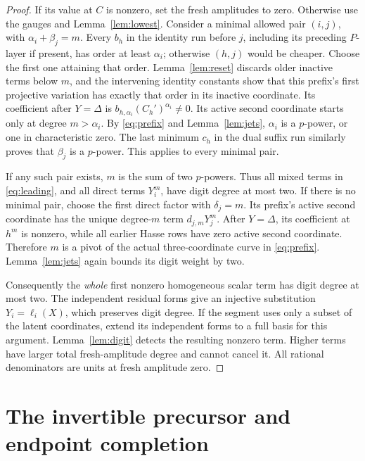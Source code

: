 \documentclass[11pt]{article}
\begin{document}
\begin{proof}
If its value at \(C\) is nonzero, set the fresh amplitudes to zero.
Otherwise use the gauges and Lemma~\ref{lem:lowest}. Consider a minimal
allowed pair \((i,j)\), with \(\alpha_i+\beta_j=m\). Every \(b_h\)
in the identity run before \(j\), including its preceding \(P\)-layer
if present, has order at least \(\alpha_i\); otherwise \((h,j)\)
would be cheaper. Choose the first one attaining that order.
Lemma~\ref{lem:reset} discards older inactive terms below \(m\), and
the intervening identity constants show that this prefix's first
projective variation has exactly that order in its inactive coordinate.
Its coefficient after \(Y=\Delta\) is
\(b_{h,\alpha_i}(C_h')^{\alpha_i}\ne0\). Its active second coordinate
starts only at degree \(m>\alpha_i\). By \eqref{eq:prefix} and
Lemma~\ref{lem:jets}, \(\alpha_i\) is a \(p\)-power, or one in
characteristic zero. The last minimum \(c_h\) in the dual suffix run
similarly proves that \(\beta_j\) is a \(p\)-power. This applies to
every minimal pair.

If any such pair exists, \(m\) is the sum of two \(p\)-powers. Thus
all mixed terms in \eqref{eq:leading}, and all direct terms \(Y_i^m\),
have digit degree at most two. If there is no minimal pair, choose the
first direct factor with \(\delta_j=m\). Its prefix's active second
coordinate has the unique degree-\(m\) term \(d_{j,m}Y_j^m\).
After \(Y=\Delta\), its coefficient at \(h^m\) is nonzero, while all
earlier Hasse rows have zero active second coordinate. Therefore \(m\)
is a pivot of the actual three-coordinate curve in \eqref{eq:prefix}.
Lemma~\ref{lem:jets} again bounds its digit weight by two.

Consequently the \emph{whole} first nonzero homogeneous scalar term
has digit degree at most two. The independent residual forms give an
injective substitution \(Y_i=\ell_i(X)\), which preserves digit degree.
If the segment uses only a subset of the latent coordinates, extend
its independent forms to a full basis for this argument.
Lemma~\ref{lem:digit} detects the resulting nonzero term. Higher terms
have larger total fresh-amplitude degree and cannot cancel it. All
rational denominators are units at fresh amplitude zero.
\end{proof}

\section{The invertible precursor and endpoint completion}
\end{document}
